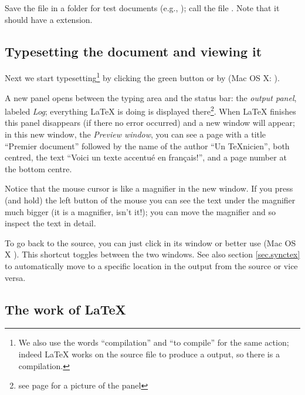 Save the file in a folder for test documents (e.g., ); call the file . Note that it should have a  extension.

\subsection{Typesetting the document and viewing it}

Next we start typesetting\footnote{We also use the words ``compilation'' and ``to compile'' for the same action; indeed {\LaTeX} works on the source file to produce a  output, so there is a compilation.} by clicking the green button 
or by  (Mac OS X: ).

A new panel opens between the typing area and the status bar: the \emph{output panel}, labeled \emph{Log}; everything {\LaTeX} is doing is displayed there\footnote{see page \pageref{fig:consoleOutput} for a picture of the panel}. When {\LaTeX} finishes this panel disappears (if there no error occurred) and a new window will appear; in this new window, the \emph{Preview window}, you can see a page with a title \foreignlanguage{frenchb}{``Premier document''} followed by the name of the author \foreignlanguage{frenchb}{``Un TeXnicien''}, both centred, the text
\foreignlanguage{frenchb}{``Voici un texte accentué en français!''}, and a page number at the bottom centre.

Notice that the mouse cursor is like a magnifier in the new window. If you press (and hold) the left button of the mouse you can see the text under the magnifier much bigger (it is a magnifier, isn't it!); you can move the magnifier and so inspect the text in detail.

To go back to the source, you can just click in its window or better use  (Mac OS X ). This shortcut toggles between the two windows. See also section \ref{sec.synctex} to automatically move to a specific location in the output from the source or vice versa.

\subsection{The work of \LaTeX}

